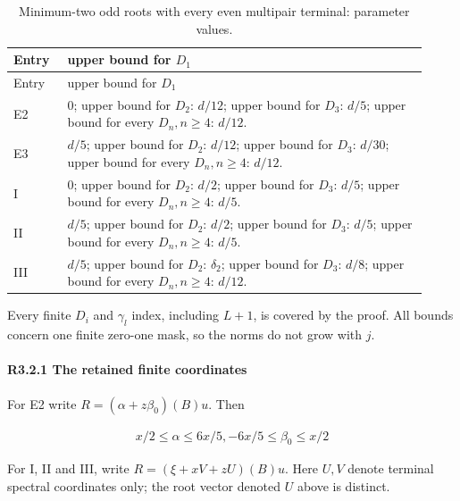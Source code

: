 \begingroup\small
\setlength{\tabcolsep}{3pt}
\setlength{\LTleft}{0pt}\setlength{\LTright}{\fill}
\begin{longtable}{@{}p{0.1200\linewidth}p{0.8000\linewidth}@{}}
\caption{Minimum-two odd roots with every even multipair terminal: parameter values.}\label{tab:parameters:r2-c003:3}\\
\toprule
Entry & upper bound for \(D_1\) \\
\midrule\endfirsthead
\toprule
Entry & upper bound for \(D_1\) \\
\midrule\endhead
\bottomrule\endfoot
E2 & 0; upper bound for \(D_2\): \(d/12\); upper bound for \(D_3\): \(d/5\); upper bound for every \(D_n,\allowbreak  n\ge 4\): \(d/12\). \\
\addlinespace[2pt]
E3 & \(d/5\); upper bound for \(D_2\): \(d/12\); upper bound for \(D_3\): \(d/30\); upper bound for every \(D_n,\allowbreak  n\ge 4\): \(d/12\). \\
\addlinespace[2pt]
I & 0; upper bound for \(D_2\): \(d/2\); upper bound for \(D_3\): \(d/5\); upper bound for every \(D_n,\allowbreak  n\ge 4\): \(d/5\). \\
\addlinespace[2pt]
II & \(d/5\); upper bound for \(D_2\): \(d/2\); upper bound for \(D_3\): \(d/5\); upper bound for every \(D_n,\allowbreak  n\ge 4\): \(d/5\). \\
\addlinespace[2pt]
III & \(d/5\); upper bound for \(D_2\): \(\delta_2\); upper bound for \(D_3\): \(d/8\); upper bound for every \(D_n,\allowbreak  n\ge 4\): \(d/12\). \\
\end{longtable}
\endgroup


Every finite \(D_i\) and \(\gamma_l\) index, including \(L+1\), is covered by the proof. All bounds concern one finite zero-one mask, so the norms do not grow with \(j\).

\paragraph{R3.2.1 The retained finite coordinates}

For E2 write \(R=(\alpha+z\beta_0)(B)u\). Then

\[
\begin{gathered}
x/2\le \alpha\le 6x/5,-6x/5\le \beta_0\le x/2 
\end{gathered}\tag{R3.2.1}
\]

For I, II and III, write \(R=(\xi+xV+zU)(B)u\). Here \(U,\allowbreak \allowbreak  V\) denote terminal spectral coordinates only; the root vector denoted \(U\) above is distinct.


